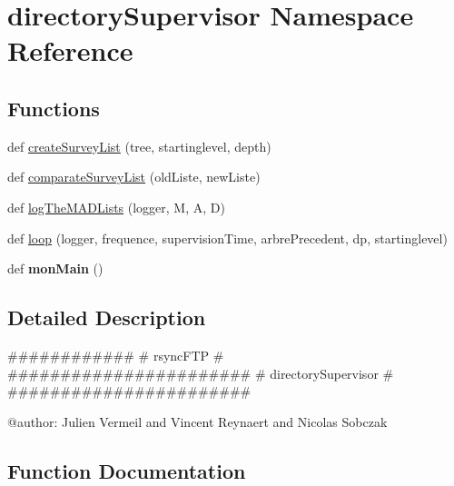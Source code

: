 \hypertarget{namespacedirectory_supervisor}{}\section{directory\+Supervisor Namespace Reference}
\label{namespacedirectory_supervisor}
\subsection*{Functions}
\begin{DoxyCompactItemize}
\item 
def \hyperlink{namespacedirectory_supervisor_a9d74cc8524cb7e3e77edb67c0ee845ca}{create\+Survey\+List} (tree, startinglevel, depth)
\item 
def \hyperlink{namespacedirectory_supervisor_a8320472c590edd49c3dece24e50f0751}{comparate\+Survey\+List} (old\+Liste, new\+Liste)
\item 
def \hyperlink{namespacedirectory_supervisor_a318858380e4893dce2f9d4a878c954c9}{log\+The\+M\+A\+D\+Lists} (logger, M, A, D)
\item 
def \hyperlink{namespacedirectory_supervisor_a97d1cb03388e91e814277fa2a7105f83}{loop} (logger, frequence, supervision\+Time, arbre\+Precedent, dp, startinglevel)
\item 
def {\bfseries mon\+Main} ()\hypertarget{namespacedirectory_supervisor_a88ef40a67ed7762ac92c5fdf5167204d}{}\label{namespacedirectory_supervisor_a88ef40a67ed7762ac92c5fdf5167204d}

\end{DoxyCompactItemize}


\subsection{Detailed Description}
\begin{DoxyVerb}############
# rsyncFTP #
#######################
# directorySupervisor #
#######################

@author: Julien Vermeil and Vincent Reynaert and Nicolas Sobczak
\end{DoxyVerb}
 

\subsection{Function Documentation}
